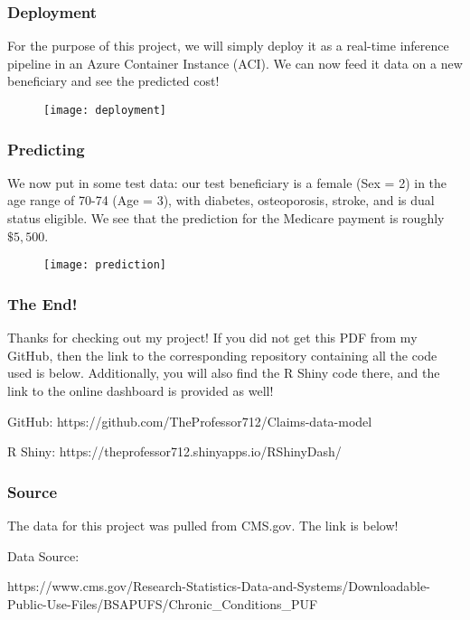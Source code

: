 \documentclass{beamer}
\begin{document}

\begin{frame}

\frametitle{Deployment}

For the purpose of this project, we will simply deploy it as a real-time inference pipeline in an Azure Container Instance (ACI). We can now feed it data on a new beneficiary and see the predicted cost!

\begin{figure}
\texttt{[image: deployment]}
\end{figure}


\end{frame}



\begin{frame}

\frametitle{Predicting}

We now put in some test data: our test beneficiary is a female (Sex = 2) in the age range of 70-74 (Age = 3), with diabetes, osteoporosis, stroke, and is dual status eligible. We see that the prediction for the Medicare payment is roughly $\$5,500$.

\begin{figure}
\texttt{[image: prediction]}
\end{figure}


\end{frame}



\begin{frame}

\frametitle{The End!}

Thanks for checking out my project! If you did not get this PDF from my GitHub, then the link to the corresponding repository containing all the code used is below. Additionally, you will also find the R Shiny code there, and the link to the online dashboard is provided as well!

\bigskip
\bigskip

GitHub: https://github.com/TheProfessor712/Claims-data-model

\smallskip

R Shiny: https://theprofessor712.shinyapps.io/RShinyDash/






\end{frame}




\begin{frame}

\frametitle{Source}

The data for this project was pulled from CMS.gov. The link is below!

\bigskip

Data Source: 

https://www.cms.gov/Research-Statistics-Data-and-Systems/Downloadable-Public-Use-Files/BSAPUFS/Chronic\_Conditions\_PUF





\end{frame}


\end{document}
